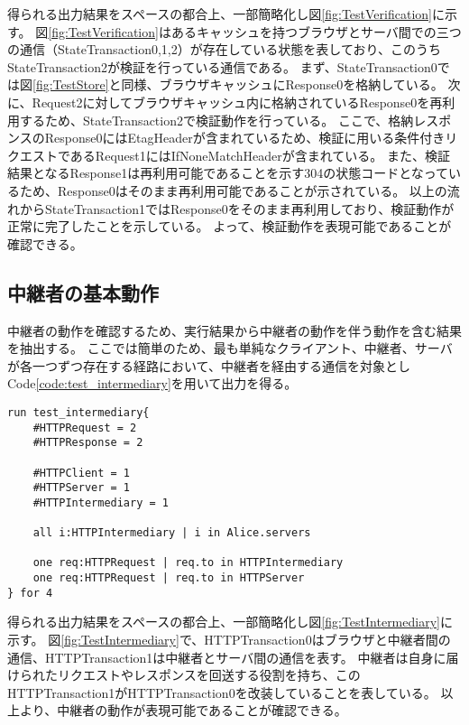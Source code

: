 \documentclass[journal]{IEEEtran}
\begin{document}
得られる出力結果をスペースの都合上、一部簡略化し図\ref{fig:TestVerification}に示す。
図\ref{fig:TestVerification}はあるキャッシュを持つブラウザとサーバ間での三つの通信（StateTransaction0,1,2）が存在している状態を表しており、このうちStateTransaction2が検証を行っている通信である。
まず、StateTransaction0では図\ref{fig:TestStore}と同様、ブラウザキャッシュにResponse0を格納している。
次に、Request2に対してブラウザキャッシュ内に格納されているResponse0を再利用するため、StateTransaction2で検証動作を行っている。
ここで、格納レスポンスのResponse0にはEtagHeaderが含まれているため、検証に用いる条件付きリクエストであるRequest1にはIfNoneMatchHeaderが含まれている。
また、検証結果となるResponse1は再利用可能であることを示す304の状態コードとなっているため、Response0はそのまま再利用可能であることが示されている。
以上の流れからStateTransaction1ではResponse0をそのまま再利用しており、検証動作が正常に完了したことを示している。
よって、検証動作を表現可能であることが確認できる。


\subsection{中継者の基本動作}
中継者の動作を確認するため、実行結果から中継者の動作を伴う動作を含む結果を抽出する。
ここでは簡単のため、最も単純なクライアント、中継者、サーバが各一つずつ存在する経路において、中継者を経由する通信を対象としCode\ref{code:test_intermediary}を用いて出力を得る。

\begin{lstlisting}[caption=中継者の動作, label=code:test_intermediary]
run test_intermediary{
	#HTTPRequest = 2
	#HTTPResponse = 2

	#HTTPClient = 1
	#HTTPServer = 1
	#HTTPIntermediary = 1

	all i:HTTPIntermediary | i in Alice.servers

	one req:HTTPRequest | req.to in HTTPIntermediary
	one req:HTTPRequest | req.to in HTTPServer
} for 4
\end{lstlisting}

得られる出力結果をスペースの都合上、一部簡略化し図\ref{fig:TestIntermediary}に示す。
図\ref{fig:TestIntermediary}で、HTTPTransaction0はブラウザと中継者間の通信、HTTPTransaction1は中継者とサーバ間の通信を表す。
中継者は自身に届けられたリクエストやレスポンスを回送する役割を持ち、このHTTPTransaction1がHTTPTransaction0を改装していることを表している。
以上より、中継者の動作が表現可能であることが確認できる。
\end{document}
